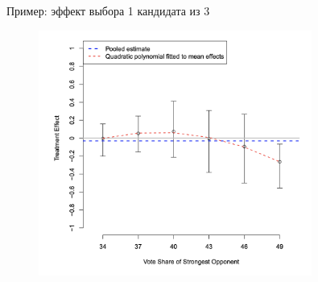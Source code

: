 \begin{frame}{Пример: эффект выбора 1 кандидата из 3}
    \begin{figure}
        \centering
        \includegraphics[width=0.8\textwidth]{Images/pooled_vs_hte.png}
    \end{figure}
\end{frame}



